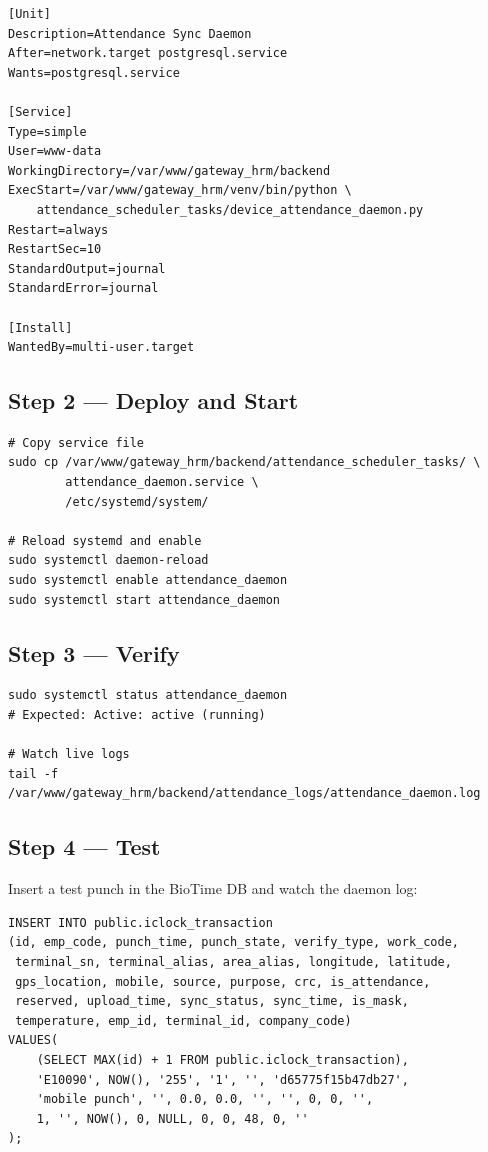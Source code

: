 \documentclass[12pt,a4paper]{article}
\begin{document}
\begin{lstlisting}[style=bashstyle, caption={attendance\_daemon.service}]
[Unit]
Description=Attendance Sync Daemon
After=network.target postgresql.service
Wants=postgresql.service

[Service]
Type=simple
User=www-data
WorkingDirectory=/var/www/gateway_hrm/backend
ExecStart=/var/www/gateway_hrm/venv/bin/python \
    attendance_scheduler_tasks/device_attendance_daemon.py
Restart=always
RestartSec=10
StandardOutput=journal
StandardError=journal

[Install]
WantedBy=multi-user.target
\end{lstlisting}

\subsection{Step 2 — Deploy and Start}

\begin{lstlisting}[style=bashstyle, caption={Deploy the systemd service}]
# Copy service file
sudo cp /var/www/gateway_hrm/backend/attendance_scheduler_tasks/ \
        attendance_daemon.service \
        /etc/systemd/system/

# Reload systemd and enable
sudo systemctl daemon-reload
sudo systemctl enable attendance_daemon
sudo systemctl start attendance_daemon
\end{lstlisting}

\subsection{Step 3 — Verify}

\begin{lstlisting}[style=bashstyle, caption={Check daemon status}]
sudo systemctl status attendance_daemon
# Expected: Active: active (running)

# Watch live logs
tail -f /var/www/gateway_hrm/backend/attendance_logs/attendance_daemon.log
\end{lstlisting}

\subsection{Step 4 — Test}

Insert a test punch in the BioTime DB and watch the daemon log:

\begin{lstlisting}[style=sqlstyle, caption={Test punch insert}]
INSERT INTO public.iclock_transaction
(id, emp_code, punch_time, punch_state, verify_type, work_code,
 terminal_sn, terminal_alias, area_alias, longitude, latitude,
 gps_location, mobile, source, purpose, crc, is_attendance,
 reserved, upload_time, sync_status, sync_time, is_mask,
 temperature, emp_id, terminal_id, company_code)
VALUES(
    (SELECT MAX(id) + 1 FROM public.iclock_transaction),
    'E10090', NOW(), '255', '1', '', 'd65775f15b47db27',
    'mobile punch', '', 0.0, 0.0, '', '', 0, 0, '',
    1, '', NOW(), 0, NULL, 0, 0, 48, 0, ''
);
\end{lstlisting}
\end{document}
